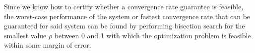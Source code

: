 Since we know how to certify whether a convergence rate guarantee is feasible, the worst-case performance of the system or fastest convergence rate that can be guaranteed for said system can be found by performing bisection search for the smallest value $\rho$ between 0 and 1 with which the optimization problem is feasible within some margin of error.
